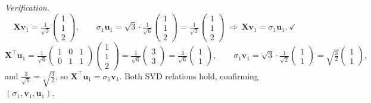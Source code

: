 \documentclass[12pt,a4paper]{article}
\theoremstyle{definition}
\newcommand{\Xb}{\mathbf{X}}
\newcommand{\vv}{\mathbf{v}}
\newcommand{\uu}{\mathbf{u}}
\newcommand{\T}{^{\!\top}}
\begin{document}
\emph{Verification.}
\[
\Xb\vv_1=\tfrac{1}{\sqrt2}\begin{pmatrix}1\\1\\2\end{pmatrix},
\qquad
\sigma_1\uu_1=\sqrt3\cdot\tfrac{1}{\sqrt6}\begin{pmatrix}1\\1\\2\end{pmatrix}
=\tfrac{1}{\sqrt2}\begin{pmatrix}1\\1\\2\end{pmatrix}
\ \Rightarrow\ \Xb\vv_1=\sigma_1\uu_1.\ \checkmark
\]
\[
\Xb\T\uu_1=\tfrac{1}{\sqrt6}\begin{pmatrix}1&0&1\\0&1&1\end{pmatrix}\!\begin{pmatrix}1\\1\\2\end{pmatrix}
=\tfrac{1}{\sqrt6}\begin{pmatrix}3\\3\end{pmatrix}
=\tfrac{3}{\sqrt6}\begin{pmatrix}1\\1\end{pmatrix},
\qquad
\sigma_1\vv_1=\sqrt3\cdot\tfrac{1}{\sqrt2}\begin{pmatrix}1\\1\end{pmatrix}
=\sqrt{\tfrac32}\begin{pmatrix}1\\1\end{pmatrix},
\]
and $\tfrac{3}{\sqrt6}=\sqrt{\tfrac32}$, so $\Xb\T\uu_1=\sigma_1\vv_1.$ \checkmark
Both SVD relations hold, confirming $(\sigma_1,\vv_1,\uu_1)$.
\end{document}
